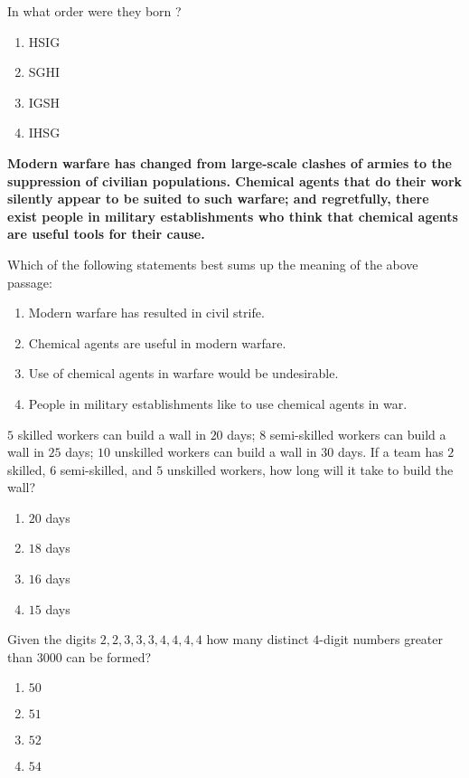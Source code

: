     In what order were they born ?

    \begin{enumerate}
        \item HSIG
        \item SGHI
        \item IGSH
        \item IHSG
    \end{enumerate}

    \item \textbf{Modern warfare has changed from large-scale clashes of armies to the suppression of civilian populations. Chemical agents that do their work silently appear to be suited to such warfare; and regretfully, there exist people in military establishments who think that chemical agents are useful tools for their cause.}

    Which of the following statements best sums up the meaning of the above passage:

    \begin{enumerate}
        \item Modern warfare has resulted in civil strife.
        \item Chemical agents are useful in modern warfare.
        \item Use of chemical agents in warfare would be undesirable.
        \item People in military establishments like to use chemical agents in war.
    \end{enumerate}

    \item $5$ skilled workers can build a wall in $20$ days; $8$ semi-skilled workers can build a wall in $25$ days; $10$ unskilled workers can build a wall in $30$ days. If a team has $2$ skilled, $6$ semi-skilled, and $5$ unskilled workers, how long will it take to build the wall?

    \begin{enumerate}
        \item $20$ days
        \item $18$ days
        \item $16$ days
        \item $15$ days
    \end{enumerate}

    \item Given the digits $2, 2, 3, 3, 3, 4, 4, 4, 4$ how many distinct $4$-digit numbers greater than $3000$ can be formed?

    \begin{enumerate}
        \item $50$
        \item $51$
        \item $52$
        \item $54$
    \end{enumerate}




    



